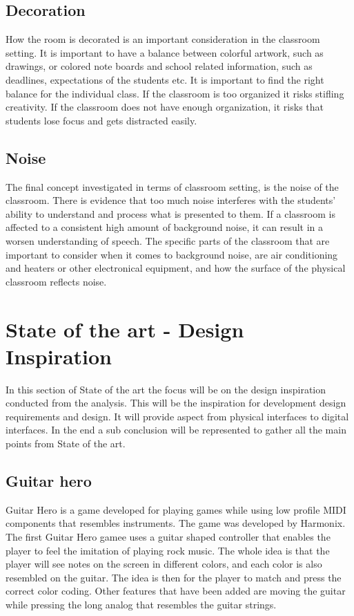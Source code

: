 \subsection{Decoration}
How the room is decorated is an important consideration in the classroom setting. It is important to have a balance between colorful artwork, such as drawings, or colored note boards and school related information, such as deadlines, expectations of the students etc. It is important to find the right balance for the individual class. If the classroom is too organized it risks stifling creativity. If the classroom does not have enough organization, it risks that students lose focus and gets distracted easily.\\

\subsection{Noise}
The final concept investigated in terms of classroom setting, is the noise of the classroom. There is evidence that too much noise interferes with the students’ ability to understand and process what is presented to them. If a classroom is affected to a consistent high amount of background noise, it can result in a worsen understanding of speech. The specific parts of the classroom that are important to consider when it comes to background noise, are air conditioning and heaters or other electronical equipment, and how the surface of the physical classroom reflects noise.\\



\section{State of the art - Design Inspiration}\label{sec:sota}
In this section of State of the art the focus will be on the design inspiration conducted from the analysis. This will be the inspiration for development design requirements and design. It will provide aspect from physical interfaces to digital interfaces. In the end a sub conclusion will be represented to gather all the main points from State of the art. 

\subsection{Guitar hero}\label{sec:guitarHero} 
Guitar Hero is a game developed for playing games while using low profile MIDI components that resembles instruments. The game was developed by Harmonix. The first Guitar Hero gamee uses a guitar shaped controller that enables the player to feel the imitation of playing rock music. The whole idea is that the player will see notes on the screen in different colors, and each color is also resembled on the guitar. The idea is then for the player to match and press the correct color coding. Other features that have been added are moving the guitar while pressing the long analog that resembles the guitar strings. 

